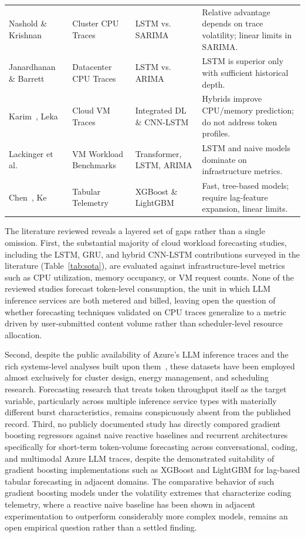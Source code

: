 \documentclass[conference, a4paper]{IEEEtran}
\begin{document}
\begin{table}[htbp]
\begin{tabular}{lp{4cm}p{4cm}p{6.5cm}}
Nashold \& Krishnan~\cite{nashold2020lstmsarima} & Cluster CPU Traces & LSTM vs. SARIMA & Relative advantage depends on trace volatility; linear limits in SARIMA. \\
Janardhanan \& Barrett~\cite{janardhanan2017cpu} & Datacenter CPU Traces & LSTM vs. ARIMA & LSTM is superior only with sufficient historical depth. \\
Karim~\cite{karim2022integrated}, Leka~\cite{leka2021cnnlstm} & Cloud VM Traces & Integrated DL \& CNN-LSTM & Hybrids improve CPU/memory prediction; do not address token profiles. \\
Lackinger et al.~\cite{lackinger2024timeseries} & VM Workload Benchmarks & Transformer, LSTM, ARIMA & LSTM and naive models dominate on infrastructure metrics. \\
Chen~\cite{chen2016xgboost}, Ke~\cite{ke2017lightgbm} & Tabular Telemetry & XGBoost \& LightGBM & Fast, tree-based models; require lag-feature expansion, linear limits. \\ \hline
\end{tabular}
\end{table}

The literature reviewed reveals a layered set of gaps rather than a single omission. First, the substantial majority of cloud workload forecasting studies, including the LSTM, GRU, and hybrid CNN-LSTM contributions surveyed in the literature (Table~\ref{tab:sota}), are evaluated against infrastructure-level metrics such as CPU utilization, memory occupancy, or VM request counts. None of the reviewed studies forecast token-level consumption, the unit in which LLM inference services are both metered and billed, leaving open the question of whether forecasting techniques validated on CPU traces generalize to a metric driven by user-submitted content volume rather than scheduler-level resource allocation.

Second, despite the public availability of Azure's LLM inference traces and the rich systems-level analyses built upon them~\cite{patel2024splitwise,stojkovic2025dynamollm}, these datasets have been employed almost exclusively for cluster design, energy management, and scheduling research. Forecasting research that treats token throughput itself as the target variable, particularly across multiple inference service types with materially different burst characteristics, remains conspicuously absent from the published record. Third, no publicly documented study has directly compared gradient boosting regressors against naive reactive baselines and recurrent architectures specifically for short-term token-volume forecasting across conversational, coding, and multimodal Azure LLM traces, despite the demonstrated suitability of gradient boosting implementations such as XGBoost and LightGBM for lag-based tabular forecasting in adjacent domains. The comparative behavior of such gradient boosting models under the volatility extremes that characterize coding telemetry, where a reactive naive baseline has been shown in adjacent experimentation to outperform considerably more complex models, remains an open empirical question rather than a settled finding.
\end{document}

